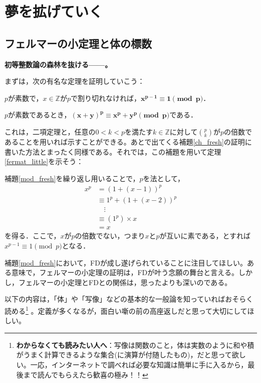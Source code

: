 \section{夢を拡げていく}\label{dreaming}
\subsection{フェルマーの小定理と体の標数}
\textbf{初等整数論の森林を抜ける------。}

\vspace{10pt}

まずは，次の有名な定理を証明していこう：

\begin{thm}[フェルマーの小定理]\label{fermat_little}
  $p$が素数で，$x \in \mathbb{Z}$が$p$で割り切れなければ，$\boldsymbol{x^{p-1} \equiv 1 \pmod{p}}$．
\end{thm}

\begin{lemma}[\textsf{FD}]\label{mod_fresh}
  $p$が素数であるとき，$\boldsymbol{(x + y)^p \equiv x^p + y^p \pmod{p}}$である．
\end{lemma}
  これは，二項定理と，任意の$0 < k < pを満たすk \in \mathbb{Z}$に対して$\binom{p}{k}$が$p$の倍数であることを用いれば示すことができる。あとで出てくる補題\ref{ch_fresh}の証明に書いた方法とまったく同様である。それでは，この補題を用いて定理\ref{fermat_little}を示そう：
\begin{prf}
  補題\ref{mod_fresh}を繰り返し用いることで，$p$を法として，
  \begin{align*}
    x^{p} & = (1 + (x - 1))^p  \\
    & \equiv 1^p + (1 + (x - 2))^p \\
    & \quad \vdots \\
    & \equiv (1^p) \times x \\
    & = x
  \end{align*}
  を得る．ここで，$x$が$p$の倍数でない，つまり$x$と$p$が互いに素である，とすれば$x^{p-1} \equiv 1 \pmod{p}$となる．
\end{prf}

補題\ref{mod_fresh}において，\textsf{FD}が成し遂げられていることに注目してほしい。ある意味で，フェルマーの小定理の証明は，\textsf{FD}が叶う念願の舞台と言える。しかし，フェルマーの小定理と\textsf{FD}との関係は，思ったよりも深いのである。

以下の内容は，「体」や「写像」などの基本的な一般論を知っていればおそらく読める\footnote{
\textbf{わからなくても読みたい人へ}：写像は関数のこと，体は実数のように和や積がうまく計算できるような集合(に演算が付随したもの)，だと思って欲しい。一応，インターネットで調べれば必要な知識は簡単に手に入るから，最後まで読んでもらえたら歓喜の極み！！
} 。定義が多くなるが，面白い噺の前の高座返しだと思って大切にしてほしい。


